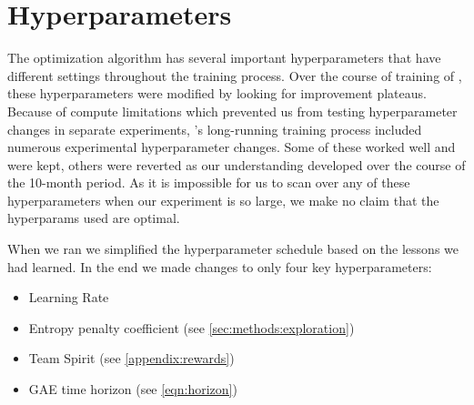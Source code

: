 \documentclass[ocean-paper.tex]{subfiles}
\begin{document}
\section{Hyperparameters}\label{appendix:hyperparams}
The optimization algorithm has several important hyperparameters that have different settings throughout the training process. 
Over the course of training of \openaifive, these hyperparameters were modified by looking for improvement plateaus.
Because of compute limitations which prevented us from testing hyperparameter changes in separate experiments, \openaifive's long-running training process included numerous experimental hyperparameter changes. 
Some of these worked well and were kept, others were reverted as our understanding developed over the course of the 10-month period. 
As it is impossible for us to scan over any of these hyperparameters when our experiment is so large, we make no claim that the hyperparams used are optimal. 

When we ran \cleanexpname we simplified the hyperparameter schedule based on the lessons we had learned. 
In the end we made changes to only four key hyperparameters:
\begin{itemize}
    \item Learning Rate
    \item Entropy penalty coefficient (see \autoref{sec:methods:exploration})
    \item Team Spirit (see \autoref{appendix:rewards})
    \item GAE time horizon (see \autoref{eqn:horizon})
\end{itemize}
\end{document}
